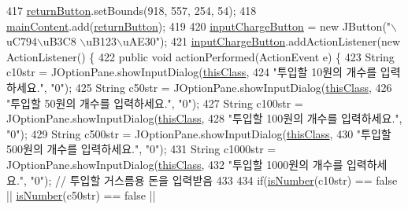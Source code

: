 \begin{DoxyCode}
{{{{{{{{{{{{{{{{{{{{{{{{{{{{{{{{{{{{{{{{{{{{{{{{{{{{{{417         \hyperlink{class_vending_machine_1_1_machine_u_i_ad82aa0418636517fefcd1ec842d44523}{returnButton}.setBounds(918, 557, 254, 54);
418         \hyperlink{class_vending_machine_1_1_machine_u_i_a2a9d8b6482b348ca6efb5ff6973e3a3b}{mainContent}.add(\hyperlink{class_vending_machine_1_1_machine_u_i_ad82aa0418636517fefcd1ec842d44523}{returnButton});
419         
420         \hyperlink{class_vending_machine_1_1_machine_u_i_af087897ffa9ab50127ab87daf7fb072f}{inputChargeButton} = \textcolor{keyword}{new} JButton(\textcolor{stringliteral}{"\(\backslash\)uC794\(\backslash\)uB3C8 \(\backslash\)uB123\(\backslash\)uAE30"});
421         \hyperlink{class_vending_machine_1_1_machine_u_i_af087897ffa9ab50127ab87daf7fb072f}{inputChargeButton}.addActionListener(\textcolor{keyword}{new} ActionListener() \{
422             \textcolor{keyword}{public} \textcolor{keywordtype}{void} actionPerformed(ActionEvent e) \{
423                 String c10str = JOptionPane.showInputDialog(\hyperlink{class_vending_machine_1_1_machine_u_i_a0d705e137d12427a9af68595eb2be582}{thisClass},
424                         \textcolor{stringliteral}{"투입할 10원의 개수를 입력하세요."}, \textcolor{stringliteral}{"0"});
425                 String c50str = JOptionPane.showInputDialog(\hyperlink{class_vending_machine_1_1_machine_u_i_a0d705e137d12427a9af68595eb2be582}{thisClass},
426                         \textcolor{stringliteral}{"투입할 50원의 개수를 입력하세요."}, \textcolor{stringliteral}{"0"});
427                 String c100str = JOptionPane.showInputDialog(\hyperlink{class_vending_machine_1_1_machine_u_i_a0d705e137d12427a9af68595eb2be582}{thisClass},
428                         \textcolor{stringliteral}{"투입할 100원의 개수를 입력하세요."}, \textcolor{stringliteral}{"0"});
429                 String c500str = JOptionPane.showInputDialog(\hyperlink{class_vending_machine_1_1_machine_u_i_a0d705e137d12427a9af68595eb2be582}{thisClass},
430                         \textcolor{stringliteral}{"투입할 500원의 개수를 입력하세요."}, \textcolor{stringliteral}{"0"});
431                 String c1000str = JOptionPane.showInputDialog(\hyperlink{class_vending_machine_1_1_machine_u_i_a0d705e137d12427a9af68595eb2be582}{thisClass},
432                         \textcolor{stringliteral}{"투입할 1000원의 개수를 입력하세요."}, \textcolor{stringliteral}{"0"});  \textcolor{comment}{// 투입할 거스름용 돈을 입력받음}
433                 
434                 \textcolor{keywordflow}{if}(\hyperlink{class_vending_machine_1_1_machine_u_i_a7f5aa2e1b49c150c3b479b7e5123cf25}{isNumber}(c10str) == \textcolor{keyword}{false} || \hyperlink{class_vending_machine_1_1_machine_u_i_a7f5aa2e1b49c150c3b479b7e5123cf25}{isNumber}(c50str) == \textcolor{keyword}{false} || 
}}}}}}}}}}}}}}}}}}}}}}}}}}}}}}}}}}}}}}}}}}}}}}}}}}}}}}
\end{DoxyCode}
